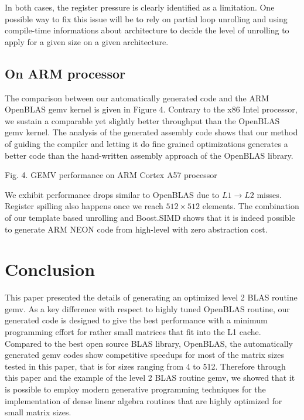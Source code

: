 \documentclass[../main]{subfiles}
\begin{document}
In both cases, the register pressure is clearly identified as a
limitation. One possible way to fix this issue will be to rely
on partial loop unrolling and using compile-time informations
about architecture to decide the level of unrolling to apply for
a given size on a given architecture.

\subsection{
  On ARM processor
}

The comparison between our automatically generated code
and the ARM OpenBLAS gemv kernel is given in Figure 4.
Contrary to the x86 Intel processor, we sustain a comparable
yet slightly better throughput than the OpenBLAS gemv
kernel. The analysis of the generated assembly code shows
that our method of guiding the compiler and letting it do
fine grained optimizations generates a better code than the
hand-written assembly approach of the OpenBLAS library.


Fig. 4. GEMV performance on ARM Cortex A57 processor

We exhibit performance drops similar to OpenBLAS due to
$L1 \rightarrow L2$ misses. Register spilling also happens once we reach
$512 \times 512$ elements. The combination of our template based
unrolling and Boost.SIMD shows that it is indeed possible to
generate ARM NEON code from high-level \cpp with zero
abstraction cost.

\section{
  Conclusion
}

This paper presented the details of generating an optimized
level 2 BLAS routine gemv. As a key difference with respect
to highly tuned OpenBLAS routine, our generated code
is designed to give the best performance with a minimum
programming effort for rather small matrices that fit into the
L1 cache. Compared to the best open source BLAS library,
OpenBLAS, the automatically generated gemv codes show
competitive speedups for most of the matrix sizes tested in
this paper, that is for sizes ranging from 4 to 512. Therefore
through this paper and the example of the level 2 BLAS
routine gemv, we showed that it is possible to employ modern
generative programming techniques for the implementation
of dense linear algebra routines that are highly optimized for
small matrix sizes.
\end{document}
